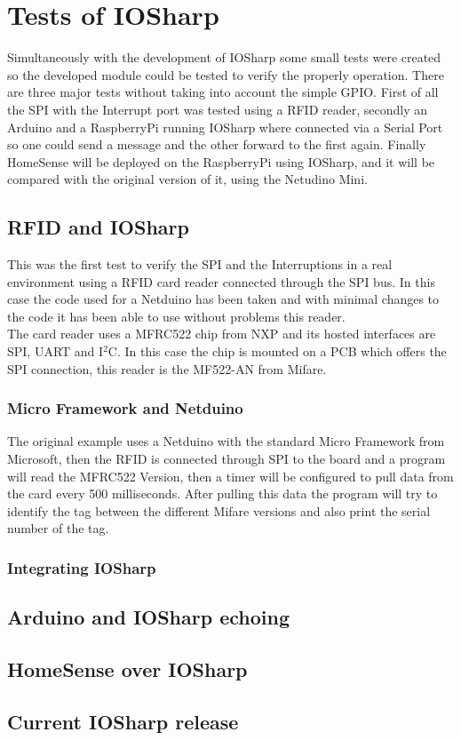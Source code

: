\chapter{Tests of IOSharp}\label{C:IOSharp Implementation}
Simultaneously with the development of IOSharp some small tests were created so the developed module could be tested to verify the properly operation. There are three major tests without taking into account the simple GPIO. First of all the SPI with the Interrupt port was tested using a RFID reader, secondly an Arduino and a RaspberryPi running IOSharp where connected via a Serial Port so one could send a message and the other forward to the first again. Finally HomeSense will be deployed on the RaspberryPi using IOSharp, and it will be compared with the original version of it, using the Netudino Mini.

\section{RFID and IOSharp}\label{S:rfid-iosharp}
This was the first test to verify the SPI and the Interruptions in a real environment using a RFID card reader connected through the SPI bus. In this case the code used for a Netduino has been taken and with minimal changes to the code it has been able to use without problems this reader.
\\
The card reader uses a MFRC522 chip from NXP and its hosted interfaces are SPI, UART and I$^{2}$C. In this case the chip is mounted on a PCB which offers the SPI connection, this reader is the MF522-AN from Mifare.

\subsection{Micro Framework and Netduino}\label{S:IOEx-SPI-Using-NETMF}
The original example uses a Netduino with the standard Micro Framework from Microsoft, then the RFID is connected through SPI to the board and a program will read the MFRC522 Version, then a timer will be configured to pull data from the card every 500 milliseconds. After pulling this data the program will try to identify the tag between the different Mifare versions and also print the serial number of the tag.


\subsection{Integrating IOSharp}\label{S:IOEx-SPI-Using-IOSharp}
 
\section{Arduino and IOSharp echoing}\label{S:rfid-iosharp}
\section{HomeSense over IOSharp}\label{S:HomeSense-IOSharp}
\section{Current IOSharp release}\label{S:current-iosharp-release}